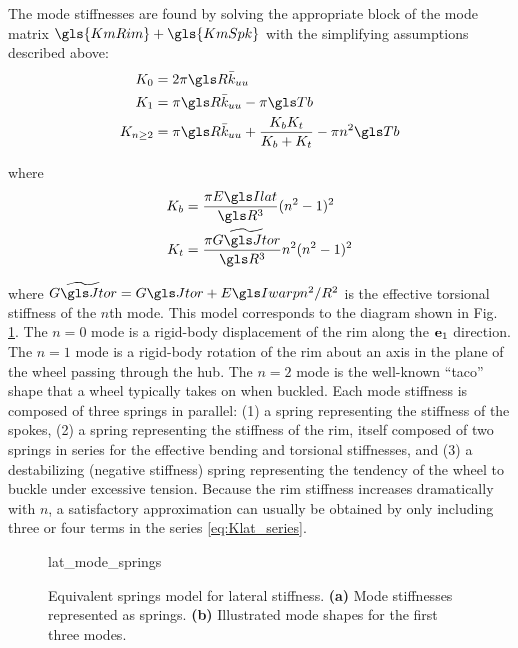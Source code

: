 \documentclass[\rootdir/thesis.tex]{subfiles}
\begin{document}
The mode stiffnesses are found by solving the appropriate block of the mode matrix $\gls{KmRim} + \gls{KmSpk}$ with the simplifying assumptions described above:
\begin{subequations}\label{eq:Kn}
\begin{align}
K_0 &= 2\pi\R\kuu \label{eq:Kn_0}\\
K_1 &= \pi\R\kuu - \pi\Tb\\
K_{n\geq2} & = \pi\R\kuu + \frac{\Kbend \Ktors}{\Kbend + \Ktors} - \pi n^2 \Tb \label{eq:Kn_n}
\end{align}
\end{subequations}

where
\begin{align*}
\Kbend &= \frac{\pi \EIl}{\R^3} (n^2-1)^2\\
\Ktors &= \frac{\pi \widetilde{\GJ}}{\R^3}n^2(n^2-1)^2
\end{align*}

where $\widetilde{\GJ} = \GJ + \EIw n^2/R^2$ is the effective torsional stiffness of the $n$th mode. This model corresponds to the diagram shown in Fig. \ref{fig:lat_mode_springs}. The $n=0$ mode is a rigid-body displacement of the rim along the $\mathbf{e}_1$ direction. The $n=1$ mode is a rigid-body rotation of the rim about an axis in the plane of the wheel passing through the hub. The $n=2$ mode is the well-known ``taco'' shape that a wheel typically takes on when buckled. Each mode stiffness is composed of three springs in parallel: (1) a spring representing the stiffness of the spokes, (2) a spring representing the stiffness of the rim, itself composed of two springs in series for the effective bending and torsional stiffnesses, and (3) a destabilizing (negative stiffness) spring representing the tendency of the wheel to buckle under excessive tension. Because the rim stiffness increases dramatically with $n$, a satisfactory approximation can usually be obtained by only including three or four terms in the series \eqref{eq:Klat_series}.

\begin{figure}[t]
\centering
{lat_mode_springs}
\caption[Equivalent spring model for lateral stiffness]{Equivalent springs model for lateral stiffness. \textbf{(a)} Mode stiffnesses represented as springs. \textbf{(b)} Illustrated mode shapes for the first three modes.}
\label{fig:lat_mode_springs}
\end{figure}
\end{document}
